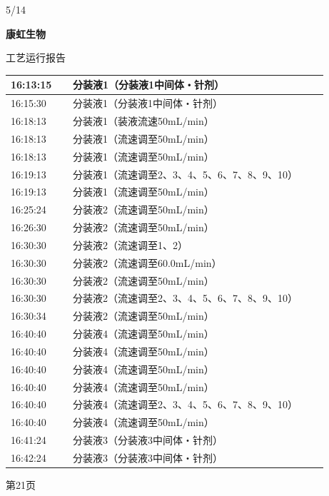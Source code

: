 \documentclass[UTF8,10pt,a4paper,fontset=fandol]{ctexart}
\newcommand{\handwritten}[1]{#1}
\begin{document}
\vfill

\handwritten{5/14}

\newpage

\noindent
\begin{minipage}[t]{0.48\linewidth}
\centering
\textbf{康虹生物}

\vspace{0.2em}
工艺运行报告

\vspace{0.4em}
\scriptsize
\begin{tabular}{|p{0.18\linewidth}|p{0.74\linewidth}|}
\hline
16:13:15 & 分装液1（分装液1中间体・针剂）\\ \hline
16:15:30 & 分装液1（分装液1中间体・针剂）\\ \hline
16:18:13 & 分装液1（装液流速50mL/min）\\ \hline
16:18:13 & 分装液1（流速调至50mL/min）\\ \hline
16:18:13 & 分装液1（流速调至50mL/min）\\ \hline
16:19:13 & 分装液1（流速调至2、3、4、5、6、7、8、9、10）\\ \hline
16:19:13 & 分装液1（流速调至50mL/min）\\ \hline
16:25:24 & 分装液2（流速调至50mL/min）\\ \hline
16:26:30 & 分装液2（流速调至50mL/min）\\ \hline
16:30:30 & 分装液2（流速调至1、2）\\ \hline
16:30:30 & 分装液2（流速调至60.0mL/min）\\ \hline
16:30:30 & 分装液2（流速调至50mL/min）\\ \hline
16:30:30 & 分装液2（流速调至2、3、4、5、6、7、8、9、10）\\ \hline
16:30:34 & 分装液2（流速调至50mL/min）\\ \hline
16:40:40 & 分装液4（流速调至50mL/min）\\ \hline
16:40:40 & 分装液4（流速调至50mL/min）\\ \hline
16:40:40 & 分装液4（流速调至50mL/min）\\ \hline
16:40:40 & 分装液4（流速调至50mL/min）\\ \hline
16:40:40 & 分装液4（流速调至2、3、4、5、6、7、8、9、10）\\ \hline
16:40:40 & 分装液4（流速调至50mL/min）\\ \hline
16:41:24 & 分装液3（分装液3中间体・针剂）\\ \hline
16:42:24 & 分装液3（分装液3中间体・针剂）\\ \hline
\end{tabular}

\vspace{0.3em}
第21页
\end{minipage}
\end{document}
